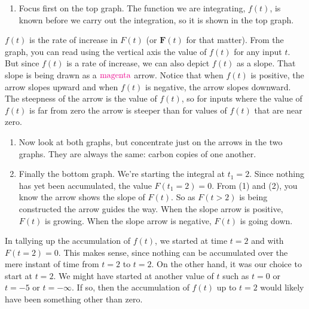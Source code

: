 \documentclass[
  letterpaper,
  DIV=11,
  numbers=noendperiod,
  oneside]{scrreprt}
\providecommand{\tightlist}{%
  \setlength{\itemsep}{0pt}\setlength{\parskip}{0pt}}
\begin{document}
\begin{enumerate}
\def\labelenumi{\arabic{enumi}.}
\tightlist
\item
  Focus first on the top graph. The function we are integrating,
  \(f(t)\), is known before we carry out the integration, so it is shown
  in the top graph.
\end{enumerate}

\(f(t)\) is the rate of increase in \(F(t)\) (or \({\mathbf F}(t)\) for
that matter). From the graph, you can read using the vertical axis the
value of \(f(t)\) for any input \(t\). But since \(f(t)\) is a rate of
increase, we can also depict \(f(t)\) as a slope. That slope is being
drawn as a \(\color{magenta}{\text{magenta}}\) arrow. Notice that when
\(f(t)\) is positive, the arrow slopes upward and when \(f(t)\) is
negative, the arrow slopes downward. The steepness of the arrow is the
value of \(f(t)\), so for inputs where the value of \(f(t)\) is far from
zero the arrow is steeper than for values of \(f(t)\) that are near
zero.

\begin{enumerate}
\def\labelenumi{\arabic{enumi}.}
\setcounter{enumi}{1}
\item
  Now look at both graphs, but concentrate just on the arrows in the two
  graphs. They are always the same: carbon copies of one another.
\item
  Finally the bottom graph. We're starting the integral at \(t_1=2\).
  Since nothing has yet been accumulated, the value \(F(t_1 = 2) = 0\).
  From (1) and (2), you know the arrow shows the slope of \(F(t)\). So
  as \(F(t>2)\) is being constructed the arrow guides the way. When the
  slope arrow is positive, \(F(t)\) is growing. When the slope arrow is
  negative, \(F(t)\) is going down.
\end{enumerate}

In tallying up the accumulation of \(f(t)\), we started at time \(t=2\)
and with \(F(t=2) = 0\). This makes sense, since nothing can be
accumulated over the mere instant of time from \(t=2\) to \(t=2\). On
the other hand, it was our choice to start at \(t=2\). We might have
started at another value of \(t\) such as \(t=0\) or \(t=-5\) or
\(t=-\infty\). If so, then the accumulation of \(f(t)\) up to \(t=2\)
would likely have been something other than zero.
\end{document}
